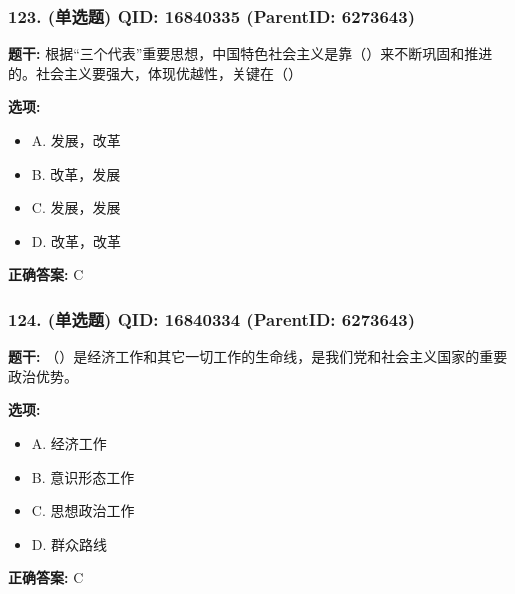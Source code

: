\documentclass[12pt,UTF8]{ctexart}
\begin{document}
\vspace{0.3em}\hrulefill\vspace{0.7em}

\subsubsection*{123. (单选题) \small QID: 16840335 (ParentID: 6273643)}

\textbf{题干:}
根据“三个代表”重要思想，中国特色社会主义是靠（）来不断巩固和推进的。社会主义要强大，体现优越性，关键在（）



\textbf{选项:}
\begin{itemize}[leftmargin=*]

  \item A. 发展，改革

  \item B. 改革，发展

  \item C. 发展，发展

  \item D. 改革，改革

\end{itemize}

\textbf{正确答案:}
C

\vspace{0.3em}\hrulefill\vspace{0.7em}

\subsubsection*{124. (单选题) \small QID: 16840334 (ParentID: 6273643)}

\textbf{题干:}
（）是经济工作和其它一切工作的生命线，是我们党和社会主义国家的重要政治优势。



\textbf{选项:}
\begin{itemize}[leftmargin=*]

  \item A. 经济工作

  \item B. 意识形态工作

  \item C. 思想政治工作

  \item D. 群众路线

\end{itemize}

\textbf{正确答案:}
C
\end{document}

